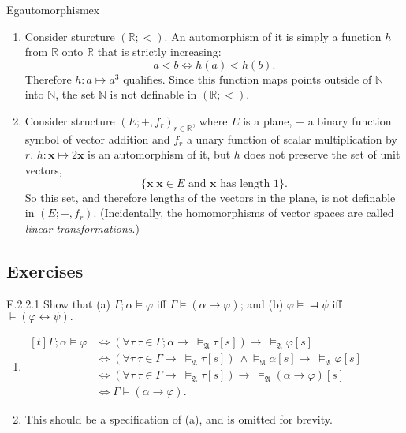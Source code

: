 \begin{reference}{Eg}{automorphismex}
  \begin{enumerate}
    \item Consider sturcture $(\mathbb{R};<)$. An automorphism of it is simply a function $h$ from $\mathbb{R}$ onto $\mathbb{R}$ that is strictly increasing:
          \[
            a<b\Leftrightarrow h(a)<h(b).
          \]
          Therefore $h: a\mapsto a^3$ qualifies. Since this function maps points outside of $\mathbb{N}$ into $\mathbb{N}$, the set $\mathbb{N}$ is not definable in $(\mathbb{R};<)$.
    \item Consider structure $(E;+,f_r)_{r\in\mathbb{R}}$, where $E$ is a plane, $+$ a binary function symbol of vector addition and $f_r$ a unary function of scalar multiplication by $r$. $h: \mathbf{x}\mapsto 2\mathbf{x}$ is an automorphism of it, but $h$ does not preserve the set of unit vectors,
          \[
            \{\mathbf{x}|\mathbf{x}\in E\text{ and }\mathbf{x}\text{ has length }1\}.
          \]
          So this set, and therefore lengths of the vectors in the plane, is not definable in $(E;+,f_r)$. (Incidentally, the homomorphisms of vector spaces are called \textit{linear transformations}.)\qedhere
  \end{enumerate}
\end{reference}

\subsection*{Exercises}

\begin{exercise}{E.2.2.1}
  Show that (a) $\Gamma;\alpha\vDash \varphi$ iff $\Gamma\vDash(\alpha\to \varphi)$; and (b) $\varphi\vDash\Dashv \psi$ iff $\vDash(\varphi \leftrightarrow \psi).$
\end{exercise}

\begin{enumerate}[label=(\alph*)]
  \item
        $\begin{aligned}[t]
            \Gamma;\alpha\vDash \varphi & \Leftrightarrow(\forall\tau\ \tau\in\Gamma;\alpha\rightarrow\ \vDash_{\mathfrak{A}}\tau[s])\rightarrow\ \vDash_{\mathfrak{A}}\varphi[s]                                 \\
                                        & \Leftrightarrow(\forall\tau\ \tau\in \Gamma\rightarrow\ \vDash_{\mathfrak{A}}\tau[s])\ \wedge\vDash_{\mathfrak{A}}\alpha[s]\rightarrow\ \vDash_{\mathfrak{A}}\varphi[s] \\
                                        & \Leftrightarrow(\forall\tau\ \tau\in \Gamma\rightarrow\ \vDash_{\mathfrak{A}}\tau[s])\rightarrow\ \vDash_{\mathfrak{A}}(\alpha\rightarrow \varphi)[s]                   \\
                                        & \Leftrightarrow \Gamma\vDash (\alpha\rightarrow \varphi).
          \end{aligned}$
  \item This should be a specification of (a), and is omitted for brevity.
\end{enumerate}

